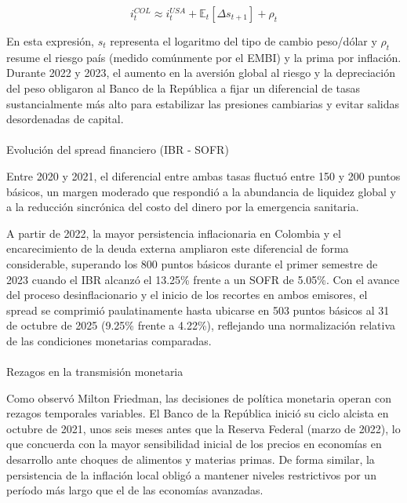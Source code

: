 \documentclass[
  10pt,
  letterpaper,
  DIV=11,
  numbers=noendperiod]{scrartcl}
\makeatletter
\let\oldparagraph\paragraph
\renewcommand{\paragraph}{
    \@ifstar
      \xxxParagraphStar
      \xxxParagraphNoStar
  }
\newcommand{\xxxParagraphStar}[1]{\oldparagraph*{#1}\mbox{}}
\newcommand{\xxxParagraphNoStar}[1]{\oldparagraph{#1}\mbox{}}
\makeatother
\begin{document}
\[i_{t}^{COL} \approx i_{t}^{USA} + \mathbb{E}_t[\Delta s_{t+1}] + \rho_t\]

En esta expresión, \(s_t\) representa el logaritmo del tipo de cambio
peso/dólar y \(\rho_t\) resume el riesgo país (medido comúnmente por el
EMBI) y la prima por inflación. Durante 2022 y 2023, el aumento en la
aversión global al riesgo y la depreciación del peso obligaron al Banco
de la República a fijar un diferencial de tasas sustancialmente más alto
para estabilizar las presiones cambiarias y evitar salidas desordenadas
de capital.

\paragraph{Evolución del spread financiero (IBR -
SOFR)}\label{evoluciuxf3n-del-spread-financiero-ibr---sofr}

Entre 2020 y 2021, el diferencial entre ambas tasas fluctuó entre 150 y
200 puntos básicos, un margen moderado que respondió a la abundancia de
liquidez global y a la reducción sincrónica del costo del dinero por la
emergencia sanitaria.

A partir de 2022, la mayor persistencia inflacionaria en Colombia y el
encarecimiento de la deuda externa ampliaron este diferencial de forma
considerable, superando los 800 puntos básicos durante el primer
semestre de 2023 cuando el IBR alcanzó el 13.25\% frente a un SOFR de
5.05\%. Con el avance del proceso desinflacionario y el inicio de los
recortes en ambos emisores, el spread se comprimió paulatinamente hasta
ubicarse en 503 puntos básicos al 31 de octubre de 2025 (9.25\% frente a
4.22\%), reflejando una normalización relativa de las condiciones
monetarias comparadas.

\paragraph{Rezagos en la transmisión
monetaria}\label{rezagos-en-la-transmisiuxf3n-monetaria}

Como observó Milton Friedman, las decisiones de política monetaria
operan con rezagos temporales variables. El Banco de la República inició
su ciclo alcista en octubre de 2021, unos seis meses antes que la
Reserva Federal (marzo de 2022), lo que concuerda con la mayor
sensibilidad inicial de los precios en economías en desarrollo ante
choques de alimentos y materias primas. De forma similar, la
persistencia de la inflación local obligó a mantener niveles
restrictivos por un período más largo que el de las economías avanzadas.
\end{document}
